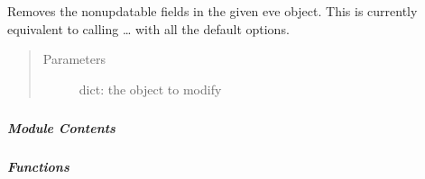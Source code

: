 \documentclass[letterpaper,10pt,english]{sphinxmanual}
\begin{document}

\begin{fulllineitems}
\label{\detokenize{autoapi/pine/backend/data/service/index:pine.backend.data.service.remove_nonupdatable_fields}}
\sphinxAtStartPar
Removes the non\sphinxhyphen{}updatable fields in the given eve object.  This is currently equivalent to
calling … with all the default options.
\begin{quote}\begin{description}
\item[{Parameters}] \leavevmode
\sphinxAtStartPar
{} \textendash{} dict: the object to modify

\end{description}\end{quote}

\end{fulllineitems}



\subparagraph{}
\label{\detokenize{autoapi/pine/backend/data/users/index:module-pine.backend.data.users}}\label{\detokenize{autoapi/pine/backend/data/users/index:pine-backend-data-users}}\label{\detokenize{autoapi/pine/backend/data/users/index::doc}}

\subparagraph{Module Contents}
\label{\detokenize{autoapi/pine/backend/data/users/index:module-contents}}

\subparagraph{Functions}
\label{\detokenize{autoapi/pine/backend/data/users/index:functions}}
\end{document}

